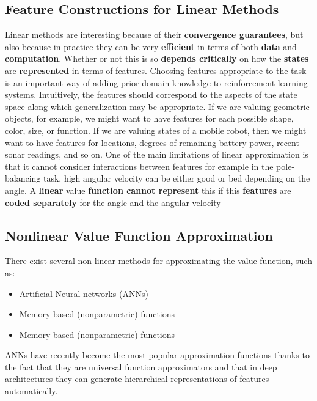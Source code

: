 \subsection{Feature Constructions for Linear Methods}
Linear methods are interesting because of their \textbf{convergence guarantees}, but also because in practice they can be very \textbf{efficient} in terms of both \textbf{data} and \textbf{computation}.
Whether or not this is so \textbf{depends critically} on how the \textbf{states} are \textbf{represented} in terms of features. Choosing features appropriate to the task is an important way of adding prior domain knowledge to reinforcement learning systems. Intuitively, the features should correspond to the aspects of the state space along which generalization may be appropriate. If we are valuing geometric objects, for example, we might want to have features for each possible shape, color, size, or function. If we are valuing states of a mobile robot, then we might want to have features for locations, degrees of remaining battery power, recent sonar readings, and so on. One of the main limitations of linear approximation is that it cannot consider interactions between features for example in the pole-balancing task, high angular velocity can be either good or bed depending on the angle.
A \textbf{linear} value \textbf{function cannot represent} this if this \textbf{features} are \textbf{coded separately} for the angle and the angular velocity

\subsection{Nonlinear Value Function Approximation}
There exist several non-linear methods for approximating the value
function, such as:
\begin{itemize}
    \item Artificial Neural networks (ANNs)
    \item Memory-based (nonparametric) functions
    \item Memory-based (nonparametric) functions
\end{itemize}
ANNs have recently become the most popular approximation functions thanks to the fact that they are universal function approximators and that in deep architectures they can generate hierarchical representations of features automatically.